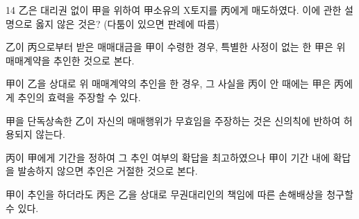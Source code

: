 \begin{question}{14}
乙은 대리권 없이 甲을 위하여 甲소유의 X토지를 丙에게 매도하였다. 이에 관한 설명으로 옳지 않은 것은? (다툼이 있으면 판례에 따름)
\begin{choices}
  \item 乙이 丙으로부터 받은 매매대금을 甲이 수령한 경우, 특별한 사정이 없는 한 甲은 위 매매계약을 추인한 것으로 본다.
  \item 甲이 乙을 상대로 위 매매계약의 추인을 한 경우, 그 사실을 丙이 안 때에는 甲은 丙에게 추인의 효력을 주장할 수 있다.
  \item 甲을 단독상속한 乙이 자신의 매매행위가 무효임을 주장하는 것은 신의칙에 반하여 허용되지 않는다.
  \item 丙이 甲에게 기간을 정하여 그 추인 여부의 확답을 최고하였으나 甲이 기간 내에 확답을 발송하지 않으면 추인은 거절한 것으로 본다.
  \item 甲이 추인을 하더라도 丙은 乙을 상대로 무권대리인의 책임에 따른 손해배상을 청구할 수 있다.
\end{choices}
\end{question}
